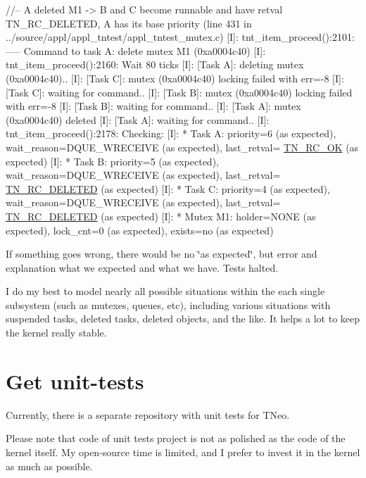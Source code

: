 \begin{DoxyCode}
\textcolor{comment}{//-- A deleted M1 -> B and C become runnable and have retval TN\_RC\_DELETED, A has its base priority (line
       431 in ../source/appl/appl\_tntest/appl\_tntest\_mutex.c) }
[I]: tnt\_item\_proceed():2101: ----- Command to task A: delete mutex M1 (0xa0004c40) 
[I]: tnt\_item\_proceed():2160: Wait 80 ticks 
[I]: [Task A]: deleting mutex (0xa0004c40).. 
[I]: [Task C]: mutex (0xa0004c40) locking failed with err=-8 
[I]: [Task C]: waiting for command.. 
[I]: [Task B]: mutex (0xa0004c40) locking failed with err=-8 
[I]: [Task B]: waiting for command.. 
[I]: [Task A]: mutex (0xa0004c40) deleted 
[I]: [Task A]: waiting for command.. 
[I]: tnt\_item\_proceed():2178: Checking: 
[I]: * Task A: priority=6 (as expected), wait\_reason=DQUE\_WRECEIVE (as expected), last\_retval=
      \hyperlink{tn__common_8h_aa43bd3da1ad4c1e61224b5f23b369876afb291924237186f5765865256c75e639}{TN\_RC\_OK} (as expected) 
[I]: * Task B: priority=5 (as expected), wait\_reason=DQUE\_WRECEIVE (as expected), last\_retval=
      \hyperlink{tn__common_8h_aa43bd3da1ad4c1e61224b5f23b369876a3252967d2fdefcfbd4eb720ed4663d84}{TN\_RC\_DELETED} (as expected) 
[I]: * Task C: priority=4 (as expected), wait\_reason=DQUE\_WRECEIVE (as expected), last\_retval=
      \hyperlink{tn__common_8h_aa43bd3da1ad4c1e61224b5f23b369876a3252967d2fdefcfbd4eb720ed4663d84}{TN\_RC\_DELETED} (as expected) 
[I]: * Mutex M1: holder=NONE (as expected), lock\_cnt=0 (as expected), exists=no (as expected) 
\end{DoxyCode}


If something goes wrong, there would be no {\ttfamily \char`\"{}as expected\char`\"{}}, but error and explanation what we expected and what we have. Tests halted.

I do my best to model nearly all possible situations within the each single subsystem (such as mutexes, queues, etc), including various situations with suspended tasks, deleted tasks, deleted objects, and the like. It helps a lot to keep the kernel really stable.\hypertarget{unit_tests_get_tests}{}\section{Get unit-\/tests}\label{unit_tests_get_tests}
Currently, there is a separate repository with unit tests for T\+Neo.

Please note that code of unit tests project is not as polished as the code of the kernel itself. My open-\/source time is limited, and I prefer to invest it in the kernel as much as possible.

